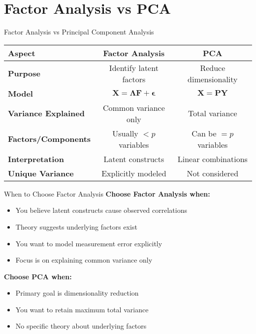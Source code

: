 \documentclass[aspectratio=169]{beamer}
\begin{document}
\section{Factor Analysis vs PCA}
\begin{frame}{Factor Analysis vs Principal Component Analysis}
  \begin{center}
  \begin{tabular}{|l|c|c|}
    \hline
    \textbf{Aspect} & \textbf{Factor Analysis} & \textbf{PCA} \\
    \hline
    \textbf{Purpose} & Identify latent factors & Reduce dimensionality \\
    \hline
    \textbf{Model} & $\mathbf{X} = \mathbf{\Lambda F} + \mathbf{\epsilon}$ & $\mathbf{X} = \mathbf{PY}$ \\
    \hline
    \textbf{Variance Explained} & Common variance only & Total variance \\
    \hline
    \textbf{Factors/Components} & Usually $< p$ variables & Can be $= p$ variables \\
    \hline
    \textbf{Interpretation} & Latent constructs & Linear combinations \\
    \hline
    \textbf{Unique Variance} & Explicitly modeled & Not considered \\
    \hline
  \end{tabular}
  \end{center}
\end{frame}

\begin{frame}{When to Choose Factor Analysis}
  \textbf{Choose Factor Analysis when:}
  \begin{itemize}
    \item You believe latent constructs cause observed correlations
    \item Theory suggests underlying factors exist
    \item You want to model measurement error explicitly
    \item Focus is on explaining common variance only
  \end{itemize}
  
  \vspace{0.5cm}
  
  \textbf{Choose PCA when:}
  \begin{itemize}
    \item Primary goal is dimensionality reduction
    \item You want to retain maximum total variance
    \item No specific theory about underlying factors
  \end{itemize}
\end{frame}
\end{document}
